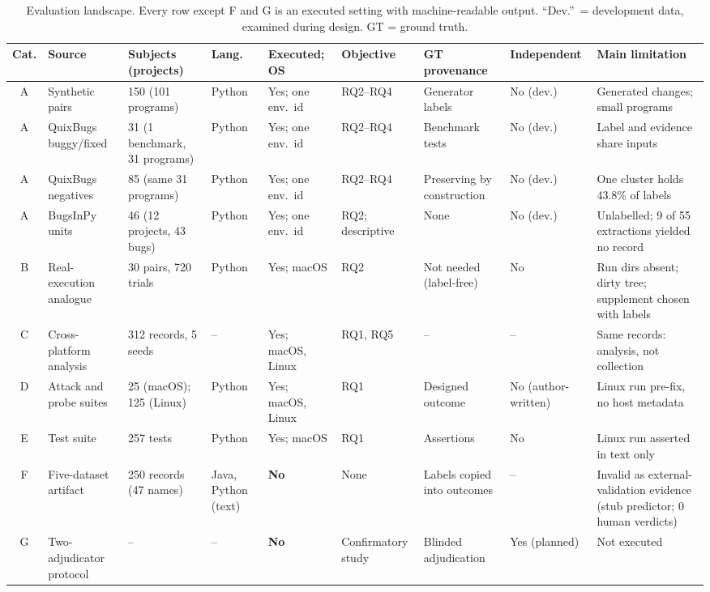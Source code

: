 \begin{table}[!t]
\caption{Evaluation landscape. Every row except F and G is an executed setting with machine-readable output. ``Dev.''\ = development data, examined during design. GT = ground truth.}
\label{tab:benchmarks}
\centering
\scriptsize
\setlength{\tabcolsep}{2.4pt}
\renewcommand{\arraystretch}{1.08}
\begin{tabular}{|c|L{2.6cm}|L{2.1cm}|L{0.9cm}|L{1.25cm}|L{1.9cm}|L{2.3cm}|L{1.3cm}|L{3.2cm}|}
\hline
Cat. & Source & Subjects (projects) & Lang. & Executed; OS & Objective & GT provenance & Independent & Main limitation \\
\hline
A & Synthetic pairs & 150 (101 programs) & Python & Yes; one env.\ id & RQ2--RQ4 & Generator labels & No (dev.) & Generated changes; small programs \\
A & QuixBugs~\cite{lin2017quixbugs} buggy/fixed & 31 (1 benchmark, 31 programs) & Python & Yes; one env.\ id & RQ2--RQ4 & Benchmark tests & No (dev.) & Label and evidence share inputs \\
A & QuixBugs negatives & 85 (same 31 programs) & Python & Yes; one env.\ id & RQ2--RQ4 & Preserving by construction & No (dev.) & One cluster holds 43.8\% of labels \\
A & BugsInPy~\cite{widyasari2020bugsinpy} units & 46 (12 projects, 43 bugs) & Python & Yes; one env.\ id & RQ2; descriptive & None & No (dev.) & Unlabelled; 9 of 55 extractions yielded no record \\
B & Real-execution analogue & 30 pairs, 720 trials & Python & Yes; macOS & RQ2 & Not needed (label-free) & No & Run dirs absent; dirty tree; supplement chosen with labels \\
C & Cross-platform analysis & 312 records, 5 seeds & -- & Yes; macOS, Linux & RQ1, RQ5 & -- & -- & Same records: analysis, not collection \\
D & Attack and probe suites & 25 (macOS); 125 (Linux) & Python & Yes; macOS, Linux & RQ1 & Designed outcome & No (author-written) & Linux run pre-fix, no host metadata \\
E & Test suite & 257 tests & Python & Yes; macOS & RQ1 & Assertions & No & Linux run asserted in text only \\
\hline
F & Five-dataset artifact & 250 records (47 names) & Java, Python (text) & \textbf{No} & None & Labels copied into outcomes & -- & Invalid as external-validation evidence (stub predictor; 0 human verdicts) \\
G & Two-adjudicator protocol & -- & -- & \textbf{No} & Confirmatory study & Blinded adjudication & Yes (planned) & Not executed \\
\hline
\end{tabular}
\end{table}

